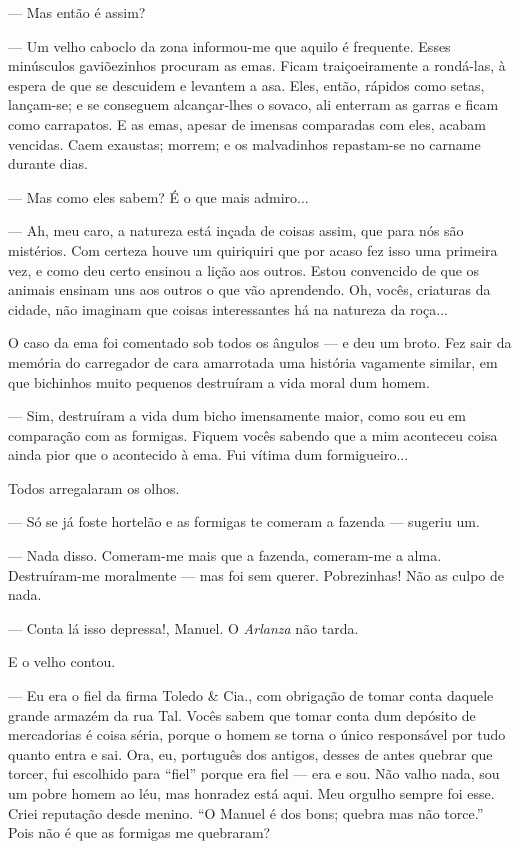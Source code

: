 --- Mas então é assim?

--- Um velho caboclo da zona informou-me que aquilo é frequente. Esses
minúsculos gaviõezinhos procuram as emas. Ficam traiçoeiramente a
rondá-las, à espera de que se descuidem e levantem a asa. Eles, então,
rápidos como setas, lançam-se; e se conseguem alcançar-lhes o sovaco,
ali enterram as garras e ficam como carrapatos. E as emas, apesar de
imensas comparadas com eles, acabam vencidas. Caem exaustas; morrem; e
os malvadinhos repastam-se no carname durante dias.

--- Mas como eles sabem? É o que mais admiro...

--- Ah, meu caro, a natureza está inçada de coisas assim, que para nós
são mistérios. Com certeza houve um quiriquiri que por acaso fez isso
uma primeira vez, e como deu certo ensinou a lição aos outros. Estou
convencido de que os animais ensinam uns aos outros o que vão
aprendendo. Oh, vocês, criaturas da cidade, não imaginam que coisas
interessantes há na natureza da roça...

O caso da ema foi comentado sob todos os ângulos --- e deu um broto. Fez
sair da memória do carregador de cara amarrotada uma história vagamente
similar, em que bichinhos muito pequenos destruíram a vida moral dum
homem.

--- Sim, destruíram a vida dum bicho imensamente maior, como sou eu em
comparação com as formigas. Fiquem vocês sabendo que a mim aconteceu
coisa ainda pior que o acontecido à ema. Fui vítima dum formigueiro...

Todos arregalaram os olhos.

--- Só se já foste hortelão e as formigas te comeram a fazenda ---
sugeriu um.

--- Nada disso. Comeram-me mais que a fazenda, comeram-me a alma.
Destruíram-me moralmente --- mas foi sem querer. Pobrezinhas! Não as
culpo de nada.

--- Conta lá isso depressa!, Manuel. O \emph{Arlanza} não tarda.

E o velho contou.

--- Eu era o fiel da firma Toledo \& Cia., com obrigação de tomar conta
daquele grande armazém da rua Tal. Vocês sabem que tomar conta dum
depósito de mercadorias é coisa séria, porque o homem se torna o único
responsável por tudo quanto entra e sai. Ora, eu, português dos antigos,
desses de antes quebrar que torcer, fui escolhido para ``fiel'' porque
era fiel --- era e sou. Não valho nada, sou um pobre homem ao léu, mas
honradez está aqui. Meu orgulho sempre foi esse. Criei reputação desde
menino. ``O Manuel é dos bons; quebra mas não torce.'' Pois não é que as
formigas me quebraram?

